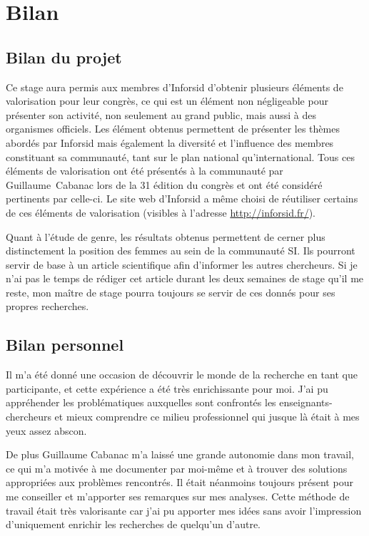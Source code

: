 \cleardoublepage
{}

\chapter{Bilan}

\section{Bilan du projet}
	Ce stage aura permis aux membres d'Inforsid d'obtenir plusieurs éléments de valorisation pour leur congrès, ce qui est un élément non négligeable pour présenter son activité, non seulement au grand public, mais aussi à des organismes officiels. Les élément obtenus permettent de présenter les thèmes abordés par Inforsid mais également la diversité et l'influence des membres constituant sa communauté, tant sur le plan national qu'international. Tous ces éléments de valorisation ont été présentés à la communauté par Guillaume~Cabanac lors de la 31 édition du congrès et ont été considéré pertinents par celle-ci. Le site web d'Inforsid a même choisi de réutiliser certains de ces éléments de valorisation (visibles à l'adresse \url{http://inforsid.fr/}).
	
	Quant à l'étude de genre, les résultats obtenus permettent de cerner plus distinctement la position des femmes au sein de la communauté SI. Ils pourront servir de base à un article scientifique afin d'informer les autres chercheurs. Si je n'ai pas le temps de rédiger cet article durant les deux semaines de stage qu'il me reste, mon maître de stage pourra toujours se servir de ces donnés pour ses propres recherches.



\section{Bilan personnel}
	Il m'a été donné une occasion de découvrir le monde de la recherche en tant que participante, et cette expérience a été très enrichissante pour moi. J'ai pu appréhender les problématiques auxquelles sont confrontés les enseignants-chercheurs et mieux comprendre ce milieu professionnel qui jusque là était à mes yeux assez abscon.
	
	De plus Guillaume Cabanac m'a laissé une grande autonomie dans mon travail, ce qui m'a motivée à me documenter par moi-même et à trouver des solutions appropriées aux problèmes rencontrés. Il était néanmoins toujours présent pour me conseiller et m'apporter ses remarques sur mes analyses. Cette méthode de travail était très valorisante car j'ai pu apporter mes idées sans avoir l'impression d'uniquement enrichir les recherches de quelqu'un d'autre.
	

